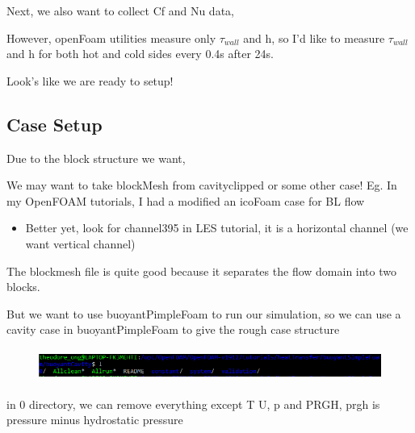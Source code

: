 \documentclass[12pt]{article}
\renewcommand{\_}{\kern-1.5pt\textunderscore\kern-1.5pt}
\begin{document}
Next, we also want to collect Cf and Nu data,\par

However, openFoam utilities measure only  \(  \tau_{wall} \)  and h, so I’d like to measure  \(  \tau_{wall} \)  and h for both hot and cold sides every 0.4s after 24s.\par

Look’s like we are ready to setup!\par



\subsection{Case Setup}
Due to the block structure we want,\par

We may want to take blockMesh from cavityclipped or some other case! Eg. In my OpenFOAM tutorials, I had a modified an icoFoam case for BL flow\par

\begin{itemize}
	\item Better yet, look for channel395 in LES tutorial, it is a horizontal channel (we want vertical channel)
\end{itemize}\par

The blockmesh file is quite good because it separates the flow domain into two blocks.\par

But we want to use buoyantPimpleFoam to run our simulation, so we can use a cavity case in buoyantPimpleFoam to give the rough case structure\par




\begin{figure}[H]
	\begin{Center}
		\includegraphics[width=6.27in,height=0.42in]{./media/image7.png}
	\end{Center}
\end{figure}



in 0 directory, we can remove everything except T U, p and P\_RGH, p\_rgh is pressure minus hydrostatic pressure\par
\end{document}
